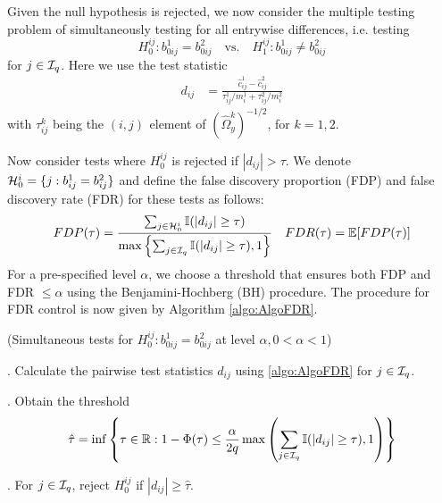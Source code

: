 \documentclass[12pt, letterpaper]{article}
\DeclareMathOperator*{\Th}{^{\text{th}}}
\numberwithin{equation}{section}
\begin{document}
Given the null hypothesis is rejected, we now consider the multiple testing problem of simultaneously testing for all entrywise differences, i.e. testing
%
$$
H_0^{ij}: b_{0 ij}^1 = b_{0ij}^2 \quad \text{vs.} \quad H_1^{ij}: b_{0 ij}^1 \neq b_{0 ij}^2 
$$
%
for $j \in {\cal{I}}_q$. Here we use the test statistic
%
\begin{align}\label{eqn:PairwiseStatistic}
d_{ij} &= \frac{\widehat c_{ij}^1 - \widehat c_{ij}^2}{\tau_{ij}^1/ m_i^1 + \tau_{ij}^2/ m_i^2}
\end{align}
%
with $\tau_{ij}^k$ being the $(i,j)^{\Th}$ element of $( \widehat \Omega_y^k)^{-1/2}$, for $k = 1,2$.

Now consider tests where $H_0^{ij}$ is rejected if $| d_{ij} | > \tau$. We denote ${\cal{H}}_0^i = \{ j: b_{ij}^1 = b_{ij}^2 \}$ and define the false discovery proportion (FDP) and false discovery rate (FDR) for these tests as follows:
%
$$
FDP (\tau) = \frac{\sum_{j \in {\cal{H}}_0^i} {\mathbb{I}}( |d_{ij}| \geq \tau)}{\max\left\{
\sum_{j \in {\cal{I}}_q} {\mathbb{I}}( |d_{ij}| \geq \tau), 1\right\} }\quad
FDR (\tau) = {\mathbb{E}} [ FDP (\tau) ]
$$
%
For a pre-specified level $\alpha$, we choose a threshold that ensures both FDP and FDR $\leq \alpha$ using the Benjamini-Hochberg (BH) procedure. %
The procedure for FDR control is now given by Algorithm \ref{algo:AlgoFDR}.

\begin{Algorithm}\label{algo:AlgoFDR}
(Simultaneous tests for $H_0^{ij}: b_{0 ij}^1 = b_{0 ij}^2$ at level $\alpha, 0< \alpha< 1$)

. Calculate the pairwise test statistics $d_{ij}$ using \eqref{algo:AlgoFDR} for $j \in {\cal{I}}_q$.

. Obtain the threshold
%
$$
\hat \tau = \inf \left\{\tau \in {\mathbb{R}}: 1 - \Phi(\tau) \leq \frac{\alpha}{2 q}
\max \left( \sum_{j \in {\cal{I}}_q} {\mathbb{I}}( |d_{ij}| \geq \tau), 1 \right) \right\}
$$
%

. For $j \in {\cal{I}}_q$, reject $H_0^{ij}$ if $|d_{ij}| \geq \hat \tau$.
\end{Algorithm}
\end{document}
